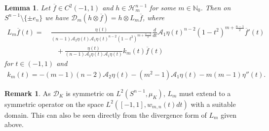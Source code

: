 \documentclass[12pt,twoside]{amsart}
\numberwithin{satz}{section}
\newtheorem{lemma}[satz]{Lemma}
\theoremstyle{definition}
\newtheorem{remark}[satz]{Remark}
\numberwithin{equation}{section}
\newcommand\N{\mathbb{N}}
\begin{document}
	\begin{lemma}\label{lemma_explicit_op}
		Let $\overline{f}\in C^2(-1,1)$ and $h\in \mathcal{H}_m^{n-1}$ for some $m\in\N_0$. Then on $S^{n-1}\setminus\{\pm e_n\}$ we have $\mathcal{D}_m(h\otimes\overline{f})=h\otimes L_m\overline{f}$, where
		\begin{align*}
			L_m\overline{f}(t)=& \  \frac{\eta(t)}{(n-1)\mathcal{A}_2\eta(t)\mathcal{A}_1\eta(t)^{n-2}(1-t^2)^{m+\frac{n-3}{2}}}\frac{d}{dt}\mathcal{A}_1\eta(t)^{n-2}(1-t^2)^{m+\frac{n-1}{2}}\overline{f}'(t)\\
			& \quad + \frac{\eta(t)}{(n-1)\mathcal{A}_2\eta(t)\mathcal{A}_1\eta(t)}k_m(t)\overline{f}(t)
		\end{align*}
		for $t\in(-1,1)$ and
		\begin{align*}
			k_m(t)=-(m-1)(n-2)\mathcal{A}_2\eta(t)-(m^2-1)\mathcal{A}_1\eta(t)-m(m-1)\eta''(t).
		\end{align*}
	\end{lemma}
	
	\begin{remark}
		As $\mathcal{D}_K$ is symmetric on $L^2(S^{n-1},\mu_K)$, $L_m$ must extend to a symmetric operator on the space $L^2\left([-1,1],w_{m,n}(t)dt\right)$ with a suitable domain. This can also be seen directly from the divergence form of $L_m$ given above.
	\end{remark}
	
\end{document}
